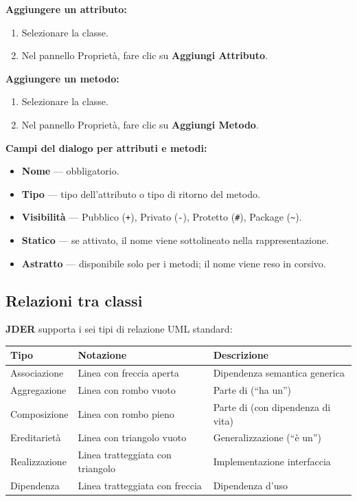 \documentclass[a4paper,11pt]{article}
\newcommand{\uielement}[1]{\textbf{#1}}
\newcommand{\jder}{\textbf{JDER}}
\begin{document}
\textbf{Aggiungere un attributo:}
\begin{enumerate}
  \item Selezionare la classe.
  \item Nel pannello Proprietà, fare clic su \uielement{Aggiungi Attributo}.
\end{enumerate}

\textbf{Aggiungere un metodo:}
\begin{enumerate}
  \item Selezionare la classe.
  \item Nel pannello Proprietà, fare clic su \uielement{Aggiungi Metodo}.
\end{enumerate}

\textbf{Campi del dialogo per attributi e metodi:}
\begin{itemize}
  \item \textbf{Nome} --- obbligatorio.
  \item \textbf{Tipo} --- tipo dell'attributo o tipo di ritorno del metodo.
  \item \textbf{Visibilità} --- Pubblico (\texttt{+}), Privato (\texttt{-}),
        Protetto (\texttt{\#}), Package (\texttt{\textasciitilde}).
  \item \textbf{Statico} --- se attivato, il nome viene sottolineato nella rappresentazione.
  \item \textbf{Astratto} --- disponibile solo per i metodi; il nome viene reso in corsivo.
\end{itemize}

\subsection{Relazioni tra classi}

\jder{} supporta i sei tipi di relazione UML standard:

\begin{center}
\begin{tabular}{@{}lll@{}}
  \toprule
  \textbf{Tipo} & \textbf{Notazione} & \textbf{Descrizione} \\
  \midrule
  Associazione  & Linea con freccia aperta & Dipendenza semantica generica \\
  Aggregazione  & Linea con rombo vuoto    & Parte di (``ha un'') \\
  Composizione  & Linea con rombo pieno    & Parte di (con dipendenza di vita) \\
  Ereditarietà  & Linea con triangolo vuoto & Generalizzazione (``è un'') \\
  Realizzazione & Linea tratteggiata con triangolo & Implementazione interfaccia \\
  Dipendenza    & Linea tratteggiata con freccia & Dipendenza d'uso \\
  \bottomrule
\end{tabular}
\end{center}
\end{document}
